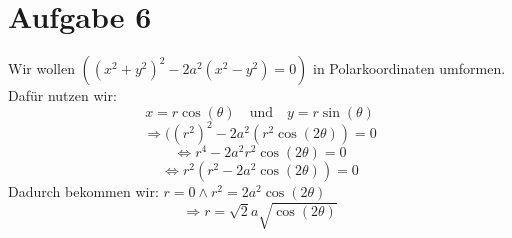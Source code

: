 \section{Aufgabe 6}
Wir wollen \(((x^2 + y^2)^2 - 2a^2(x^2 - y^2) = 0)\) in Polarkoordinaten umformen. Dafür nutzen wir:
$$x = r \cos(\theta) \quad \text{und} \quad y = r \sin(\theta)$$
$$\Rightarrow ((r^2)^2 - 2a^2(r^2 \cos(2\theta)) = 0$$
$$\Leftrightarrow r^4 - 2a^2 r^2 \cos(2\theta) = 0$$
$$\Leftrightarrow r^2(r^2 - 2a^2 \cos(2\theta)) = 0$$
Dadurch bekommen wir: \(r = 0 \land r^2 = 2a^2 \cos(2\theta) \)
$$ \Rightarrow r = \sqrt{2}a \sqrt{\cos(2\theta)}$$
